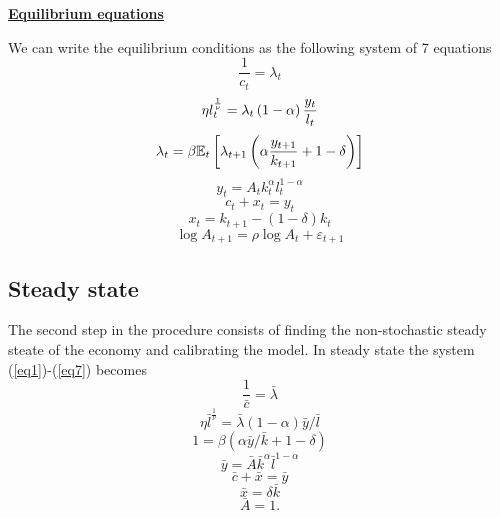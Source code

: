 \documentclass[12pt]{article}
\begin{document}
\bigskip

\underline{\textbf{Equilibrium equations}}

We can write the equilibrium conditions as the following system of 7
equations%
\begin{equation}
\frac{1}{c_{t}}=\lambda _{t}  \label{eq1}
\end{equation}%
\begin{equation}
\eta l_{t}^{\frac{1}{\nu }}=\lambda _{t}\left( 1-\alpha \right) \frac{y_{t}}{%
l_{t}}  \label{eq2}
\end{equation}%
\begin{equation}
\lambda _{t}=\beta \mathbb{E}_{t}\left[ \lambda _{t+1}\left( \alpha \frac{%
y_{t+1}}{k_{t+1}}+1-\delta \right) \right]   \label{eq3}
\end{equation}%
\begin{equation}
y_{t}=A_{t}k_{t}^{\alpha }l_{t}^{1-\alpha }  \label{eq4}
\end{equation}%
\begin{equation}
c_{t}+x_{t}=y_{t}  \label{eq5}
\end{equation}%
\begin{equation}
x_{t}=k_{t+1}-\left( 1-\delta \right) k_{t}  \label{eq6}
\end{equation}%
\begin{equation}
\log A_{t+1}=\rho \log A_{t}+\varepsilon _{t+1}  \label{eq7}
\end{equation}

\subsection{Steady state}

The second step in the procedure consists of finding the non-stochastic
steady steate of the economy and calibrating the model. In steady state the
system (\ref{eq1})-(\ref{eq7}) becomes%
\begin{equation}
\frac{1}{\bar{c}}=\bar{\lambda}  \label{ss1}
\end{equation}%
\begin{equation}
\eta \bar{l}^{\frac{1}{\nu }}=\bar{\lambda}\left( 1-\alpha \right) \bar{y}/%
\bar{l}  \label{ss2}
\end{equation}%
\begin{equation}
1=\beta \left( \alpha \bar{y}/\bar{k}+1-\delta \right)  \label{ss3}
\end{equation}%
\begin{equation}
\bar{y}=\bar{A}\bar{k}^{\alpha }\bar{l}^{1-\alpha }  \label{ss4}
\end{equation}%
\begin{equation}
\bar{c}+\bar{x}=\bar{y}  \label{ss5}
\end{equation}%
\begin{equation}
\bar{x}=\delta \bar{k}  \label{ss6}
\end{equation}%
\begin{equation}
\bar{A}=1.  \label{ss7}
\end{equation}
\end{document}
